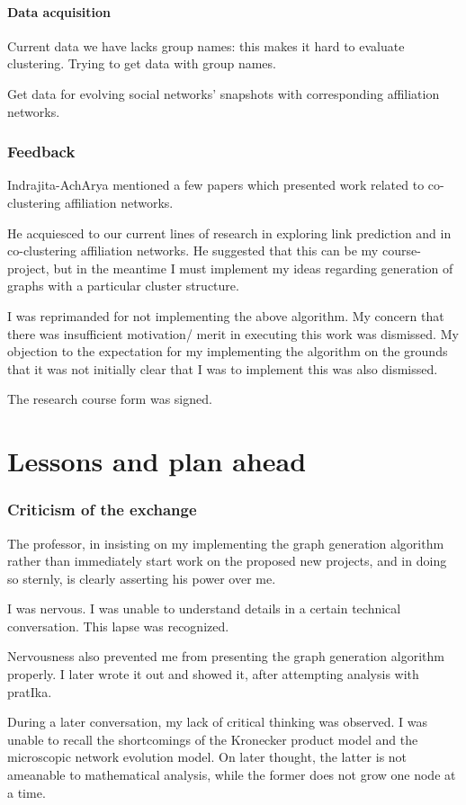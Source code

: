 \documentclass{article}
\begin{document}
\subsection{Data acquisition}
Current data we have lacks group names: this makes it hard to evaluate clustering. Trying to get data with group names.

Get data for evolving social networks' snapshots with corresponding affiliation networks.

\section{Feedback}
Indrajita-AchArya mentioned a few papers which presented work related to co-clustering affiliation networks.

He acquiesced to our current lines of research in exploring link prediction and in co-clustering affiliation networks. He suggested that this can be my course-project, but in the meantime I must implement my ideas regarding generation of graphs with a particular cluster structure.

I was reprimanded for not implementing the above algorithm. My concern that there was insufficient motivation/ merit in executing this work was dismissed. My objection to the expectation for my implementing the algorithm on the grounds that it was not initially clear that I was to implement this was also dismissed.

The research course form was signed.

\part{Lessons and plan ahead}
\section{Criticism of the exchange}
The professor, in insisting on my implementing the graph generation algorithm rather than immediately start work on the proposed new projects, and in doing so sternly, is clearly asserting his power over me.

I was nervous. I was unable to understand details in a certain technical conversation. This lapse was recognized.

Nervousness also prevented me from presenting the graph generation algorithm properly. I later wrote it out and showed it, after attempting analysis with pratIka.

During a later conversation, my lack of critical thinking was observed. I was unable to recall the shortcomings of the Kronecker product model and the microscopic network evolution model. On later thought, the latter is not ameanable to mathematical analysis, while the former does not grow one node at a time.
\end{document}
